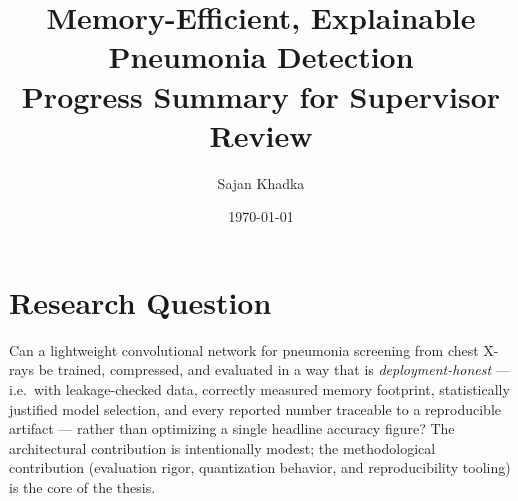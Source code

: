 \documentclass[11pt]{article}
\title{\vspace{-1em}Memory-Efficient, Explainable Pneumonia Detection\\
\large Progress Summary for Supervisor Review}
\author{Sajan Khadka}
\date{\today}
\begin{document}
\maketitle
\vspace{-2em}

\section*{Research Question}
Can a lightweight convolutional network for pneumonia screening from chest
X-rays be trained, compressed, and evaluated in a way that is
\emph{deployment-honest} --- i.e.\ with leakage-checked data, correctly
measured memory footprint, statistically justified model selection, and
every reported number traceable to a reproducible artifact --- rather than
optimizing a single headline accuracy figure? The architectural contribution
is intentionally modest; the methodological contribution (evaluation
rigor, quantization behavior, and reproducibility tooling) is the core of
the thesis.
\end{document}

